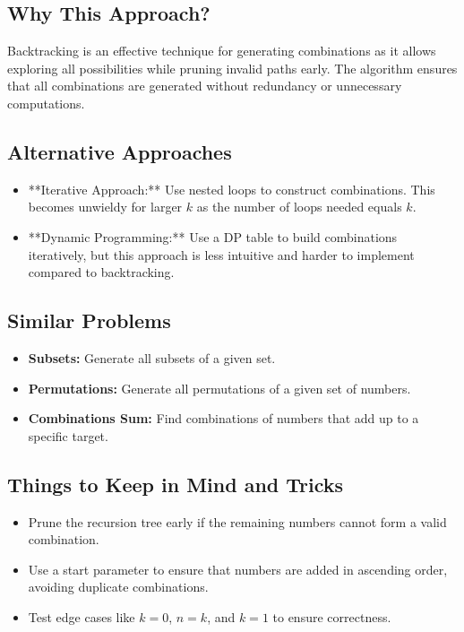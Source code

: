 \subsection*{Why This Approach?}
Backtracking is an effective technique for generating combinations as it allows exploring all possibilities while pruning invalid paths early. The algorithm ensures that all combinations are generated without redundancy or unnecessary computations.

\subsection*{Alternative Approaches}
\begin{itemize}
    \item **Iterative Approach:** Use nested loops to construct combinations. This becomes unwieldy for larger \( k \) as the number of loops needed equals \( k \).
    \item **Dynamic Programming:** Use a DP table to build combinations iteratively, but this approach is less intuitive and harder to implement compared to backtracking.
\end{itemize}

\subsection*{Similar Problems}
\begin{itemize}
    \item \textbf{Subsets:} Generate all subsets of a given set.
    \item \textbf{Permutations:} Generate all permutations of a given set of numbers.
    \item \textbf{Combinations Sum:} Find combinations of numbers that add up to a specific target.
\end{itemize}

\subsection*{Things to Keep in Mind and Tricks}
\begin{itemize}
    \item Prune the recursion tree early if the remaining numbers cannot form a valid combination.
    \item Use a start parameter to ensure that numbers are added in ascending order, avoiding duplicate combinations.
    \item Test edge cases like \( k = 0 \), \( n = k \), and \( k = 1 \) to ensure correctness.
\end{itemize}

